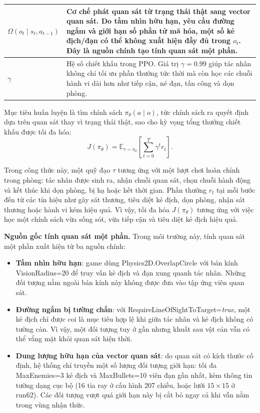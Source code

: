 \begin{table}[H]
\begin{tabular}{|p{2.7cm}|p{11.5cm}|}
        \hline
        $\Omega(o_t\mid s_t,a_{t-1})$ & Cơ chế phát quan sát từ trạng thái thật sang vector quan sát. Do tầm nhìn hữu hạn, yêu cầu đường ngắm và giới hạn số phần tử mã hóa, một số kẻ địch/đạn có thể không xuất hiện đầy đủ trong $o_t$. Đây là nguồn chính tạo tính quan sát một phần. \\
        \hline
        $\gamma$ & Hệ số chiết khấu trong PPO. Giá trị $\gamma=0.99$ giúp tác nhân không chỉ tối ưu phần thưởng tức thời mà còn học các chuỗi hành vi dài hơn như tiếp cận, né đạn, tấn công và dọn phòng. \\
        \hline
    \end{tabular}
\end{table}


Mục tiêu huấn luyện là tìm chính sách $\pi_{\theta}(a \mid o)$, tức chính sách ra quyết định dựa trên quan sát thay vì trạng thái thật, sao cho kỳ vọng tổng thưởng chiết khấu được tối đa hóa:
\begin{equation}
    J(\pi_\theta) = \mathbb{E}_{\tau \sim \pi_\theta}
    \left[\sum_{t=0}^{T}\gamma^t r_t\right].
\end{equation}

Trong công thức này, một quỹ đạo $\tau$ tương ứng với một lượt chơi hoàn chỉnh trong phòng: tác nhân được sinh ra, nhận chuỗi quan sát, chọn chuỗi hành động và kết thúc khi dọn phòng, bị hạ hoặc hết thời gian. Phần thưởng $r_t$ tại mỗi bước đến từ các tín hiệu như gây sát thương, tiêu diệt kẻ địch, dọn phòng, nhận sát thương hoặc hành vi kém hiệu quả. Vì vậy, tối đa hóa $J(\pi_\theta)$ tương ứng với việc học một chính sách vừa sống sót, vừa tiếp cận và tiêu diệt kẻ địch hiệu quả.

\textbf{Nguồn gốc tính quan sát một phần.} Trong môi trường này, tính quan sát một phần xuất hiện từ ba nguồn chính:
\begin{itemize}
    \item \textbf{Tầm nhìn hữu hạn}: game dùng Physics2D.OverlapCircle với bán kính VisionRadius=20 để truy vấn kẻ địch và đạn xung quanh tác nhân. Những đối tượng nằm ngoài bán kính này không được đưa vào tập ứng viên quan sát.
    \item \textbf{Đường ngắm bị tường chắn}: với RequireLineOfSightToTarget=\textit{true}, một kẻ địch chỉ được coi là mục tiêu hợp lệ khi giữa tác nhân và kẻ địch không có tường cản. Vì vậy, một đối tượng tuy ở gần nhưng khuất sau vật cản vẫn có thể vắng mặt khỏi quan sát hiện thời.
    \item \textbf{Dung lượng hữu hạn của vector quan sát}: do quan sát có kích thước cố định, hệ thống chỉ truyền một số lượng đối tượng giới hạn: tối đa MaxEnemies=3 kẻ địch và MaxBullets=10 viên đạn gần nhất, kèm thông tin tường dạng cục bộ (16 tia ray ở cấu hình 207 chiều, hoặc lưới $15\times15$ ở run62). Các đối tượng vượt quá giới hạn này bị cắt bỏ ngay cả khi vẫn nằm trong vùng nhận thức.
\end{itemize}

